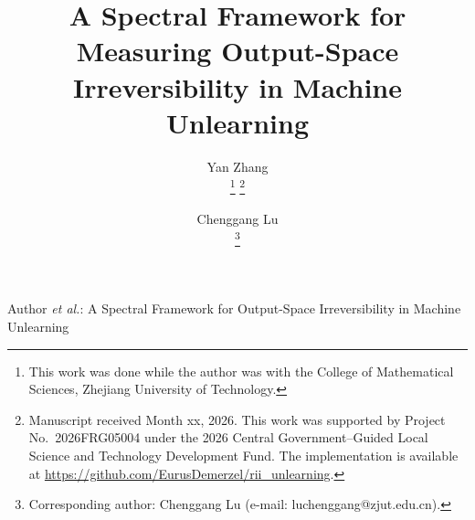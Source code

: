 \documentclass[journal]{IEEEtran}
\theoremstyle{definition}
\begin{document}
\title{A Spectral Framework for Measuring Output-Space Irreversibility in Machine Unlearning}

\author{%
Yan Zhang\\
%
\thanks{This work was done while the author was with the College of Mathematical Sciences, Zhejiang University of Technology.}%
\thanks{Manuscript received Month xx, 2026. This work was supported by Project No.~2026FRG05004 under the 2026 Central Government--Guided Local Science and Technology Development Fund. The implementation is available at \protect\url{https://github.com/EurusDemerzel/rii_unlearning}.}
\and
Chenggang Lu\\
%
\thanks{Corresponding author: Chenggang Lu (e-mail: luchenggang@zjut.edu.cn).}
}

%
{Author \MakeLowercase{\textit{et al.}}: A Spectral Framework for Output-Space Irreversibility in Machine Unlearning}

\maketitle
\end{document}
